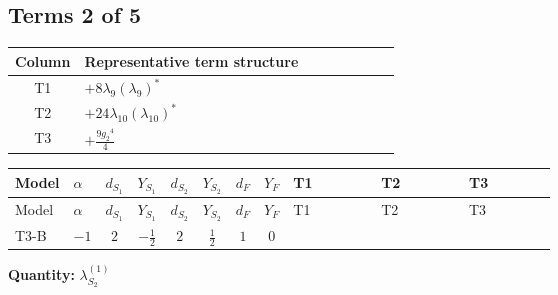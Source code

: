 \documentclass[8pt]{article}
\begin{document}
\begin{landscape}
\subsection*{Terms 2 of 5}
\begin{center}
\begin{tabular}{@{}c >{\raggedright\arraybackslash}p{0.82\linewidth}@{}}
\toprule
Column & Representative term structure \\
\midrule
T1 & \(\displaystyle +8 {\lambda_{9}} \left({\lambda_{9}}\right)^{*}\) \\
\midrule
T2 & \(\displaystyle +24 {\lambda_{10}} \left({\lambda_{10}}\right)^{*}\) \\
\midrule
T3 & \(\displaystyle +\frac{9 {g_2}^4}{4}\) \\
\midrule
\bottomrule
\end{tabular}
\end{center}
\smallskip
\tiny
\begin{longtable}{@{}llcccccc >{\raggedright\arraybackslash}p{0.21\linewidth} >{\raggedright\arraybackslash}p{0.21\linewidth} >{\raggedright\arraybackslash}p{0.21\linewidth}@{}}
\toprule
Model & $\alpha$ & $d_{S_1}$ & $Y_{S_1}$ & $d_{S_2}$ & $Y_{S_2}$ & $d_F$ & $Y_F$ & T1 & T2 & T3 \\
\midrule
\endfirsthead
\toprule
Model & $\alpha$ & $d_{S_1}$ & $Y_{S_1}$ & $d_{S_2}$ & $Y_{S_2}$ & $d_F$ & $Y_F$ & T1 & T2 & T3 \\
\midrule
\endhead
T3-B & $-1$ & $2$ & $-\frac{1}{2}$ & $2$ & $\frac{1}{2}$ & $1$ & $0$ & \scriptsize\adjustbox{max width=\linewidth}{$\begin{gathered} +8 {\lambda_{9}} \left({\lambda_{9}}\right)^{*}\end{gathered}$} & \scriptsize\adjustbox{max width=\linewidth}{$\begin{gathered} +24 {\lambda_{10}} \left({\lambda_{10}}\right)^{*}\end{gathered}$} & \scriptsize\adjustbox{max width=\linewidth}{$\begin{gathered} +\frac{9 {g_2}^4}{4}\end{gathered}$} \\
\midrule
\bottomrule
\end{longtable}
\clearpage
\noindent\textbf{Quantity: }$\lambda_{S_2}^{(1)}$\par\smallskip

\end{landscape}
\end{document}
